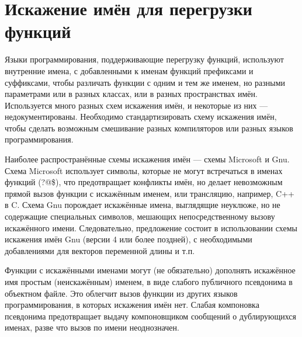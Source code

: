 \documentclass[forwardcom.tex]{subfiles}
\begin{document}
\section{Искажение имён для перегрузки функций} \label{nameMangling}
Языки программирования, поддерживающие перегрузку функций, используют внутренние имена, с добавленными к именам функций префиксами и суффиксами, чтобы различать функции с одним и тем же именем, но разными параметрами или в разных классах, или в разных пространствах имён. Используется много разных схем искажения имён, и некоторые из них --- недокументированы. Необходимо стандартизировать схему искажения имён, чтобы сделать возможным смешивание разных компиляторов или разных языков программирования.

Наиболее распространённые схемы искажения имён --- схемы Microsoft и Gnu. Схема  Microsoft использует символы, которые не могут встречаться в именах функций (?@\$), что предотвращает конфликты имён, но делает невозможным прямой вызов функции с искажённым именем, или трансляцию, например, C++ в C. Схема Gnu порождает искажённые имена, выглядящие неуклюже, но не содержащие специальных символов, мешающих непосредственному вызову искажённого имени. Следовательно, предложение состоит в использовании схемы искажения имён Gnu (версии 4 или более поздней), с необходимыми добавлениями для векторов переменной длины и т.п.

Функции с искажёнными именами могут (не обязательно) дополнять искажённое имя простым (неискажённым) именем, в виде слабого публичного псевдонима в объектном файле. Это облегчит вызов функции из других языков программирования, в которых искажения имён нет. Слабая компоновка псевдонима предотвращает выдачу компоновщиком сообщений о дублирующихся именах, разве что вызов по имени неоднозначен.
\end{document}
